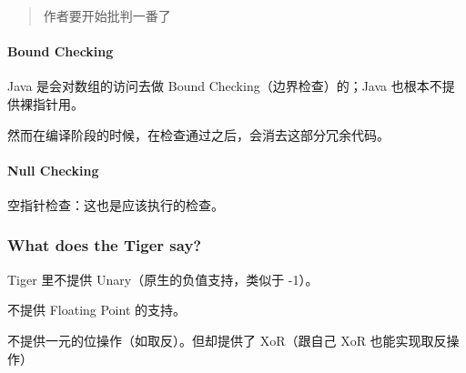 \documentclass[
]{article}
\begin{document}
\begin{quote}
作者要开始批判一番了
\end{quote}

\hypertarget{header-n145}{%
\paragraph{Bound Checking}\label{header-n145}}

Java 是会对数组的访问去做 Bound Checking（边界检查）的；Java
也根本不提供裸指针用。

然而在编译阶段的时候，在检查通过之后，会消去这部分冗余代码。

\hypertarget{header-n148}{%
\paragraph{Null Checking}\label{header-n148}}

空指针检查：这也是应该执行的检查。

\hypertarget{header-n150}{%
\subsubsection{What does the Tiger say?}\label{header-n150}}

Tiger 里不提供 Unary（原生的负值支持，类似于 -1）。

不提供 Floating Point 的支持。

不提供一元的位操作（如取反）。但却提供了 XoR（跟自己 XoR
也能实现取反操作）
\end{document}
